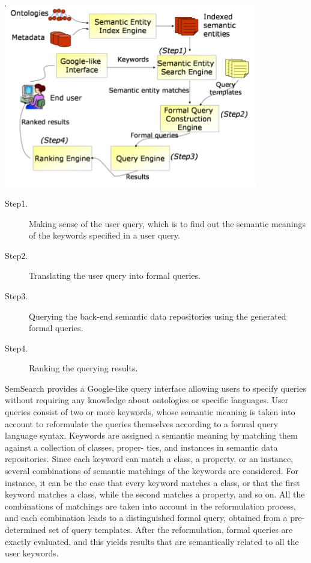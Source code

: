 \documentclass[12pt,a4]{article}
\begin{document}
\begin{center}\includegraphics[height = 8cm]{./img/sem_srch.png}\end{center}
\begin{description}
\item[Step1.] Making sense of the user query, which is to find out the semantic meanings of the keywords specified in a user query.
\item[Step2.] Translating the user query into formal queries.
\item[Step3.] Querying the back-end semantic data repositories using the generated formal queries.
\item[Step4.] Ranking the querying results.
\end{description}
SemSearch provides a Google-like query interface allowing users to specify queries without requiring any knowledge about ontologies or specific languages. User queries consist of two or more keywords, whose semantic meaning is taken into account to reformulate the queries themselves according to a formal query language syntax. Keywords are assigned a semantic meaning by matching them against a collection of classes, proper-
ties, and instances in semantic data repositories. Since each keyword can match a class, a property, or an instance, several combinations of semantic matchings of the keywords are considered. For instance, it can be the case that every keyword matches a class, or that the first keyword matches a class, while the second matches a property, and so on. All the combinations of matchings are taken into account in the reformulation process, and each combination leads to a distinguished formal query, obtained from a pre-determined set of query templates. After the reformulation, formal queries are exactly evaluated, and this yields results that are semantically related to all the user keywords.
\end{document}
